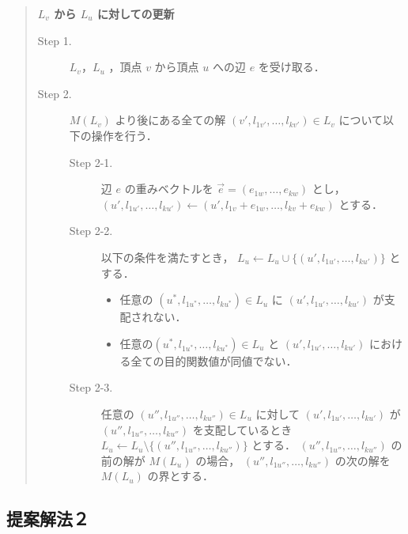 \documentclass[12pt]{optlab-bachelor}
\begin{document}
\begin{quote}
  \textbf{$L_v$ から $L_u$ に対しての更新}
  \begin{description}
    \item[Step 1.] $L_v$，$L_u$ ，頂点 $v$ から頂点 $u$ への辺 $e$ を受け取る．
    \item[Step 2.] $M(L_v)$ より後にある全ての解 $(v',l_{1v'},\ldots,l_{kv'}) \in L_v$
    について以下の操作を行う．
    \begin{description}
      \item[Step 2-1.] 辺 $e$ の重みベクトルを
      $\vec{e} = (e_{1w},\ldots,e_{kw})$ とし，
      $(u',l_{1u'},\ldots,l_{ku'}) \leftarrow
      (u',l_{1v}+e_{1w},\ldots,l_{kv}+e_{kw})$ とする．
      \item[Step 2-2.] 以下の条件を満たすとき，
      $L_u \leftarrow L_u \cup \{(u',l_{1u'},\ldots,l_{ku'})\}$ とする．
      \begin{itemize}
        \item 任意の $(u^*,l_{1u^*},\ldots,l_{ku^*})\in L_u$ に
        $(u',l_{1u'},\ldots,l_{ku'})$ が支配されない．
        \item 任意の$(u^*,l_{1u^*},\ldots,l_{ku^*}) \in L_u$ と
        $(u',l_{1u'},\ldots,l_{ku'})$ における全ての目的関数値が同値でない．
      \end{itemize}
      \item[Step 2-3.] 任意の $(u'',l_{1u''},\ldots,l_{ku''})\in L_u$
      に対して $(u',l_{1u'},\ldots,l_{ku'})$ が
      $(u'',l_{1u''},\ldots,l_{ku''})$ を支配しているとき
      $L_u \leftarrow L_u \setminus \{(u'',l_{1u''},\ldots,l_{ku''})\}$ とする．
      $(u'',l_{1u''},\ldots,l_{ku''})$ の前の解が $M(L_u)$ の場合，
      $(u'',l_{1u''},\ldots,l_{ku''})$ の次の解を $M(L_u)$ の界とする．
    \end{description}
  \end{description}
\end{quote}


\subsection{提案解法２}
\end{document}
